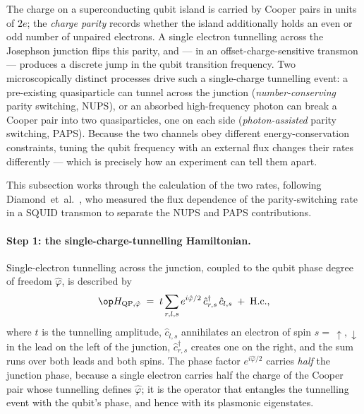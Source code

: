 \begin{phenomenon}
The charge on a superconducting qubit island is carried by Cooper
pairs in units of $2e$; the \emph{charge parity} records whether
the island additionally holds an even or odd number of unpaired
electrons. A single electron tunnelling across the Josephson
junction flips this parity, and --- in an offset-charge-sensitive
transmon --- produces a discrete jump in the qubit transition
frequency. Two microscopically distinct processes drive such a
single-charge tunnelling event: a pre-existing quasiparticle can
tunnel across the junction (\emph{number-conserving} parity
switching, NUPS), or an absorbed high-frequency photon can break a
Cooper pair into two quasiparticles, one on each side
(\emph{photon-assisted} parity switching, PAPS). Because the two
channels obey different energy-conservation constraints, tuning the
qubit frequency with an external flux changes their rates
differently --- which is precisely how an experiment can tell them
apart.
\end{phenomenon}

This subsection works through the calculation of the two rates,
following Diamond~et~al.~\cite{diamond2022}, who measured the flux
dependence of the parity-switching rate in a SQUID transmon to
separate the NUPS and PAPS contributions.

\paragraph{Step 1: the single-charge-tunnelling Hamiltonian.}
Single-electron tunnelling across the junction, coupled to the
qubit phase degree of freedom $\hat\varphi$, is described by
\begin{equation}
\label{eq:ps-tunnelling-H}
\op H_{{\rm QP},\hat\varphi}
\;=\; t\sum_{r,l,s} e^{i\hat\varphi/2}\,
\hat c_{r,s}^\dagger\,\hat c_{l,s} \;+\; \text{H.c.},
\end{equation}
where $t$ is the tunnelling amplitude, $\hat c_{l,s}$ annihilates an
electron of spin $s=\,\uparrow,\downarrow$ in the lead on the left
of the junction, $\hat c_{r,s}^\dagger$ creates one on the right,
and the sum runs over both leads and both spins. The phase factor
$e^{i\hat\varphi/2}$ carries \emph{half} the junction phase,
because a single electron carries half the charge of the Cooper
pair whose tunnelling defines $\hat\varphi$; it is the operator
that entangles the tunnelling event with the qubit's phase, and
hence with its plasmonic eigenstates.

